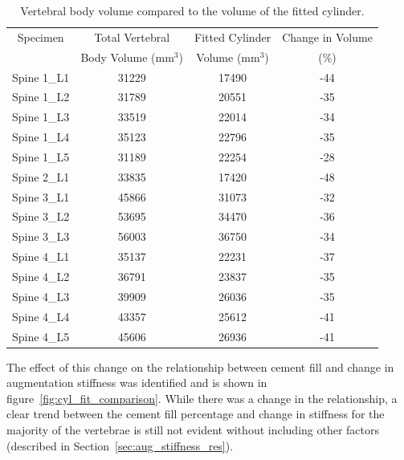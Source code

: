 \begin{table}[ht!]
\centering
  \caption{Vertebral body volume compared to the volume of the fitted cylinder.}
	\label{tab:vertebrae_vol_cyl}
  \begin{tabular}{c |c|c|c}
	  Specimen & Total Vertebral  & Fitted Cylinder & Change in Volume\\ 
	  &Body Volume (mm$^3$)&Volume (mm$^3$) &(\%)\\ \hline \hline
	  Spine 1\_L1  & 31229 & 17490 & -44\\
	  Spine 1\_L2  & 31789 & 20551 & -35\\
	  Spine 1\_L3  & 33519 & 22014 & -34\\
	  Spine 1\_L4  & 35123 & 22796 & -35\\
	  Spine 1\_L5  & 31189 & 22254 & -28\\
	  Spine 2\_L1  & 33835 & 17420 & -48\\
	  Spine 3\_L1  & 45866 & 31073 & -32\\
	  Spine 3\_L2  & 53695 & 34470 & -36\\
	  Spine 3\_L3  & 56003 & 36750 & -34\\
	  Spine 4\_L1  & 35137 & 22231 & -37\\
	  Spine 4\_L2  & 36791 & 23837 & -35\\
	  Spine 4\_L3  & 39909 & 26036 & -35\\
	  Spine 4\_L4  & 43357 & 25612 & -41\\
	  Spine 4\_L5  & 45606 & 26936 & -41\\
	  \hline
  \end{tabular}

\end{table}

The effect of this change on the relationship between cement fill and change in augmentation stiffness was identified and is shown in figure~\ref{fig:cyl_fit_comparison}.
While there was a change in the relationship, a clear trend between the cement fill percentage and change in stiffness for the majority of the vertebrae is still not evident without including other factors (described in Section~\ref{sec:aug_stiffness_res}).

